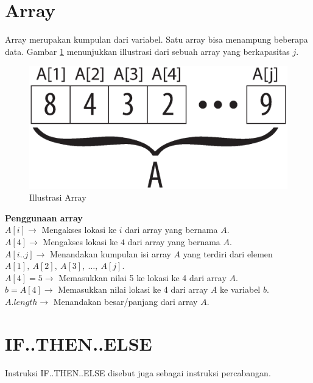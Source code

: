 \section{Array}
Array merupakan kumpulan dari variabel. Satu array bisa menampung beberapa data. Gambar \ref{fig:illustrasiArray} menunjukkan illustrasi dari sebuah array yang berkapasitas $j$.
\begin{center}
	\begin{figure}[htbp]%
		\includegraphics[scale=0.4]{fig/Array.eps}%
		\caption{Illustrasi Array}%
		\label{fig:illustrasiArray}%
	\end{figure}
\end{center}
\begin{contoh}
	\textbf{Penggunaan array}\\
	$A[i] \rightarrow$ Mengakses lokasi ke $i$ dari array yang bernama $A$.\\
	$A[4] \rightarrow$ Mengakses lokasi ke $4$ dari array yang bernama $A$.\\
	$A[i..j] \rightarrow$ Menandakan kumpulan isi array $A$ yang terdiri dari elemen $A[1],\ A[2],\ A[3],\ \ldots,\ A[j]$.\\
	$A[4] = 5 \rightarrow$ Memasukkan nilai 5 ke lokasi ke 4 dari array $A$.\\
	$b = A[4] \rightarrow$ Memasukkan nilai lokasi ke 4 dari array $A$ ke variabel $b$. 
	$A.length \rightarrow$ Menandakan besar/panjang dari array $A$.
\end{contoh}





\section{IF..THEN..ELSE}
Instruksi IF..THEN..ELSE disebut juga sebagai instruksi percabangan. 

